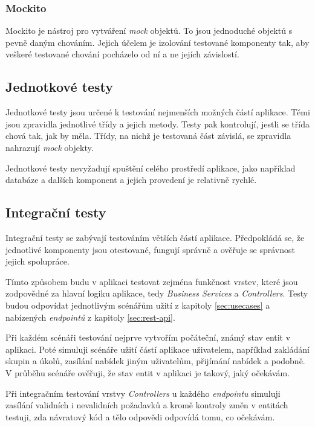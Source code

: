 \documentclass[thesis=B,czech]{FITthesis}[2012/06/26]
\begin{document}
			\subsubsection{Mockito}
			Mockito \cite{mockito} je nástroj pro vytváření \textit{mock} objektů. To jsou jednoduché  objektů s pevně daným chováním. Jejich účelem je izolování testované komponenty tak, aby veškeré testované chování pocházelo od ní a ne jejích závislostí.
		
		\subsection{Jednotkové testy}
			Jednotkové testy jsou určené k testování nejmenších možných částí aplikace. Těmi jsou zpravidla jednotlivé třídy a jejich metody. Testy pak kontrolují, jestli se třída chová tak, jak by měla. Třídy, na nichž je testovaná část závislá, se zpravidla nahrazují \textit{mock} objekty.
			
			Jednotkové testy nevyžadují spuštění celého prostředí aplikace, jako například databáze a dalších komponent a jejich provedení je relativně rychlé. 
		
		\subsection{Integrační testy}
			Integrační testy se zabývají testováním větších částí aplikace. Předpokládá se, že jednotlivé komponenty jsou otestované, fungují správně a ověřuje se správnost jejich spolupráce.
			
			Tímto způsobem budu v aplikaci testovat zejména funkčnost vrstev, které jsou zodpovědné za hlavní logiku aplikace, tedy \textit{Business Services} a \textit{Controllers}. Testy budou odpovídat jednotlivým scénářům užití z kapitoly \ref{sec:usecases} a nabízených \textit{endpointů} z kapitoly \ref{sec:rest-api}.
			
			Při každém scénáři testování nejprve vytvořím počáteční, známý stav entit v aplikaci. Poté simuluji scénáře užití částí aplikace uživatelem, například zakládání skupin a úkolů, zasílání nabídek jiným uživatelům, přijímání nabídek a podobně. V průběhu scénáře ověřuji, že stav entit v aplikaci je takový, jaký očekávám.
			
			Při integračním testování vrstvy \textit{Controllers} u každého \textit{endpointu} simuluji zasílání validních i nevalidních požadavků a kromě kontroly změn v entitách testuji, zda návratový kód a tělo odpovědi odpovídá tomu, co očekávám.
\end{document}
